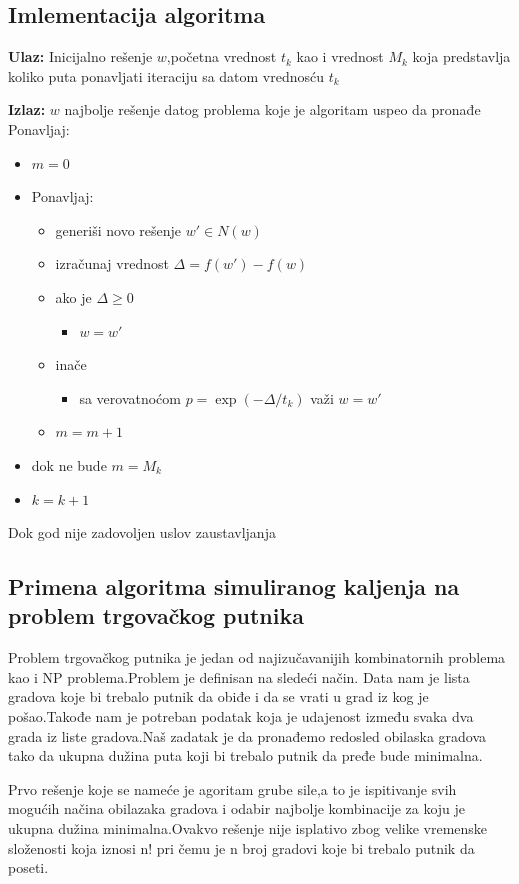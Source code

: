 \documentclass[a4paper]{article}
\begin{document}
\subsection{Imlementacija algoritma}
\textbf{Ulaz:} Inicijalno rešenje $w$,početna vrednost $t_k$ kao i vrednost $M_k$ koja predstavlja koliko puta ponavljati iteraciju sa datom vrednosću $t_k$
 \par
\textbf{Izlaz:} $w$ najbolje rešenje datog problema koje je algoritam uspeo da pronađe
\newline
Ponavljaj:
\begin{itemize}
\item[] $m=0$
\item[]  Ponavljaj:
\begin{itemize}
\item[] generiši novo rešenje  $w'\in N(w)$
\item[] izračunaj vrednost  $\Delta=f(w')-f(w)$
\item[] ako je $\Delta \geq 0$
\begin{itemize}
\item[] $w=w'$ 
\end{itemize}
\item[]inače
\begin{itemize}
\item[] sa verovatnoćom $p=\exp(-\Delta/t_k)$ važi $w=w'$ 
\end{itemize}
\item[]$m=m+1$
\end{itemize}
\item[]dok ne bude $ m=M_k$
\item[] $k=k+1$
\end{itemize}
Dok god nije zadovoljen uslov zaustavljanja


\subsection{Primena algoritma simuliranog kaljenja na problem trgovačkog putnika}


  Problem trgovačkog putnika je jedan od najizučavanijih kombinatornih problema kao i NP problema.Problem je definisan na sledeći način.
  Data nam je lista gradova koje bi trebalo putnik da obiđe i da se vrati u grad iz kog je pošao.Takođe nam je potreban podatak koja je udajenost između svaka dva grada iz liste gradova.Naš zadatak je da pronađemo redosled obilaska gradova tako da ukupna dužina puta koji bi trebalo putnik da pređe bude minimalna.\par
  Prvo rešenje koje se nameće je agoritam grube sile,a to je ispitivanje svih mogućih načina obilazaka gradova i odabir najbolje kombinacije za koju je ukupna dužina minimalna.Ovakvo rešenje nije isplativo zbog velike vremenske složenosti koja iznosi n! pri čemu je n broj gradovi koje bi trebalo putnik da poseti.\par
    
\end{document}
